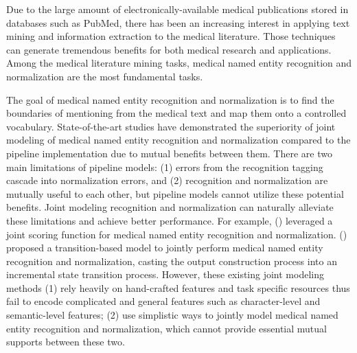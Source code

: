 
Due to the large amount of electronically-available medical publications stored in databases such as PubMed, there has been an increasing interest in applying text mining and information extraction to the medical literature. 
Those techniques can generate tremendous benefits for both medical research and applications. Among the medical literature mining tasks, medical named entity recognition and normalization are the most fundamental tasks.%


The goal of medical named entity recognition and normalization is to find the boundaries of mentioning from the medical text and map them onto a controlled vocabulary. State-of-the-art studies have demonstrated the superiority of joint modeling of medical named entity recognition and normalization compared to the pipeline implementation due to mutual benefits between them. There are two main limitations of pipeline models: (1) errors from the recognition tagging cascade into normalization errors, and (2) recognition and normalization are mutually useful to each other, but pipeline models cannot utilize these potential benefits. Joint modeling recognition and normalization can naturally alleviate these %
limitations and achieve better performance. For example, \citeauthor{Leaman2016TaggerOne} (\citeyear{Leaman2016TaggerOne}) leveraged a joint scoring function for medical named entity recognition and normalization. \citeauthor{Lou2017A} (\citeyear{Lou2017A}) proposed a transition-based model to jointly perform medical named entity recognition and normalization, casting the output construction process into an incremental state transition process. However, these existing joint modeling methods (1) rely heavily on hand-crafted features and task specific resources thus fail to encode complicated and general features such as character-level and semantic-level features; 
(2) use simplistic ways to jointly model medical named entity recognition and normalization, which cannot provide essential mutual supports between these two.   

